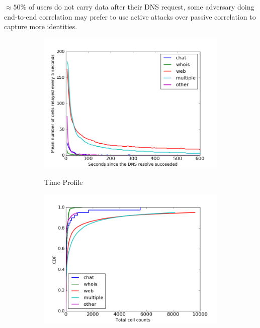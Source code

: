 $\approx 50\%$ of users do not carry data after their DNS request, some %
adversary doing end-to-end correlation may prefer to use active attacks over %
passive correlation to capture more identities.


\begin{figure} \centering
	\begin{subfigure}[t]{0.32\textwidth} \centering
\includegraphics[scale=0.3]{images/exitmeasurement.png}
		\label{fig:stats_a}
		\caption{Time Profile}
	\end{subfigure}
	\begin{subfigure}[t]{0.32\textwidth} \centering
\includegraphics[scale=0.3]{images/totcellcountscdf.png}

\end{subfigure}
\end{figure}
